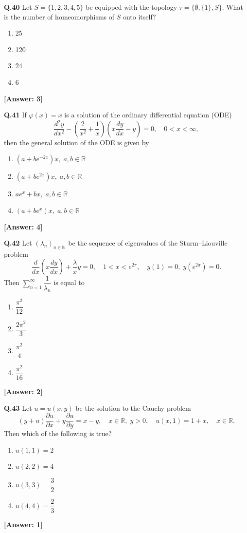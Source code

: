 \documentclass[12pt,a4paper]{article}
\newcommand{\ans}[1]{\quad\textcolor{anscolor}{\textbf{[Answer: #1]}}}
\begin{document}
\textbf{Q.40} Let $S=\{1,2,3,4,5\}$ be equipped with the topology $\tau=\{\emptyset,\{1\},S\}$. What is the number of homeomorphisms of $S$ onto itself?
\begin{enumerate}[label=\arabic*.]
\item 25 \item 120 \item 24 \item 6
\end{enumerate}\ans{3}

\textbf{Q.41} If $\varphi(x)=x$ is a solution of the ordinary differential equation (ODE)
\[\dfrac{d^2y}{dx^2}-\left(\dfrac{2}{x^2}+\dfrac{1}{x}\right)\!\left(x\dfrac{dy}{dx}-y\right)=0,\quad0<x<\infty,\]
then the general solution of the ODE is given by
\begin{enumerate}[label=\arabic*.]
\item $(a+be^{-2x})x,\;a,b\in\mathbb{R}$
\item $(a+be^{2x})x,\;a,b\in\mathbb{R}$
\item $ae^x+bx,\;a,b\in\mathbb{R}$
\item $(a+be^x)x,\;a,b\in\mathbb{R}$
\end{enumerate}\ans{4}

\textbf{Q.42} Let $(\lambda_n)_{n\in\mathbb{N}}$ be the sequence of eigenvalues of the Sturm--Liouville problem
\[\dfrac{d}{dx}\!\left(x\dfrac{dy}{dx}\right)+\dfrac{\lambda}{x}y=0,\quad1<x<e^{2\pi},\quad y(1)=0,\;y(e^{2\pi})=0.\]
Then $\displaystyle\sum_{n=1}^\infty\dfrac{1}{\lambda_n}$ is equal to
\begin{enumerate}[label=\arabic*.]
\item $\dfrac{\pi^2}{12}$ \item $\dfrac{2\pi^2}{3}$ \item $\dfrac{\pi^2}{4}$ \item $\dfrac{\pi^2}{16}$
\end{enumerate}\ans{2}

\textbf{Q.43} Let $u=u(x,y)$ be the solution to the Cauchy problem
\[(y+u)\dfrac{\partial u}{\partial x}+y\dfrac{\partial u}{\partial y}=x-y,\quad x\in\mathbb{R},\;y>0,\quad u(x,1)=1+x,\quad x\in\mathbb{R}.\]
Then which of the following is true?
\begin{enumerate}[label=\arabic*.]
\item $u(1,1)=2$ \item $u(2,2)=4$
\item $u(3,3)=\dfrac{3}{2}$ \item $u(4,4)=\dfrac{2}{3}$
\end{enumerate}\ans{1}
\end{document}
